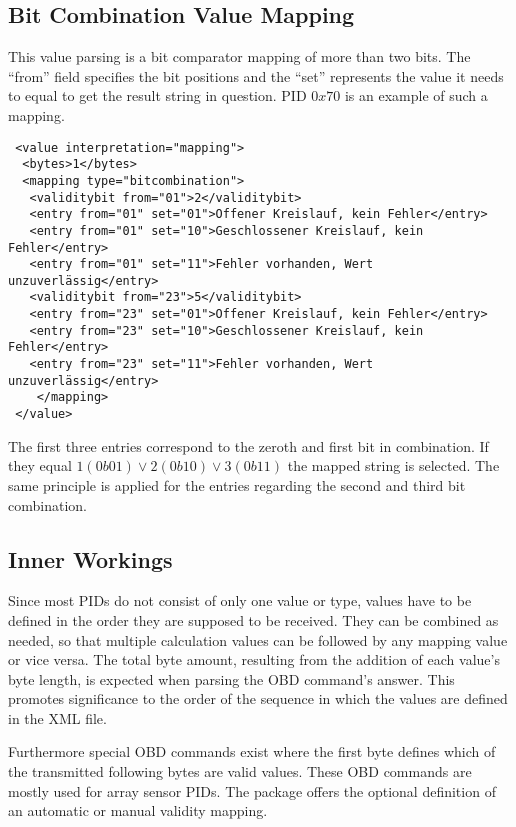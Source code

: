 \subsection{Bit Combination Value Mapping}

This value parsing is a bit comparator mapping of more than two bits. The ``from'' field specifies the bit positions and the ``set'' represents the 
value it needs to equal to get the result string in question. PID $0x70$ is an example of such a mapping.

\begin{verbatim}
 <value interpretation="mapping">
  <bytes>1</bytes>
  <mapping type="bitcombination">
   <validitybit from="01">2</validitybit>
   <entry from="01" set="01">Offener Kreislauf, kein Fehler</entry>
   <entry from="01" set="10">Geschlossener Kreislauf, kein Fehler</entry>
   <entry from="01" set="11">Fehler vorhanden, Wert unzuverlässig</entry>
   <validitybit from="23">5</validitybit>
   <entry from="23" set="01">Offener Kreislauf, kein Fehler</entry>
   <entry from="23" set="10">Geschlossener Kreislauf, kein Fehler</entry>
   <entry from="23" set="11">Fehler vorhanden, Wert unzuverlässig</entry>
    </mapping>    
 </value>
\end{verbatim}

The first three entries correspond to the zeroth and first bit in combination. If they equal $1(0b01) \vee 2(0b10) \vee 3(0b11)$ the mapped string is selected.
The same principle is applied for the entries regarding the second and third bit combination.

\subsection{Inner Workings}

Since most PIDs do not consist of only one value or type, values have to be defined in the order they are supposed to be received. They can be 
combined as needed, so that multiple calculation values can be followed by any mapping value or vice versa. The total byte amount, resulting from the
addition of each value's byte length, is expected when parsing the OBD command's answer. This promotes significance to the order of the sequence in which the 
values are defined in the XML file.

Furthermore special OBD commands exist where the first byte defines which of the transmitted following bytes are valid values. These OBD 
commands are mostly used for array sensor PIDs. The package offers the optional definition of an automatic or manual validity mapping.

